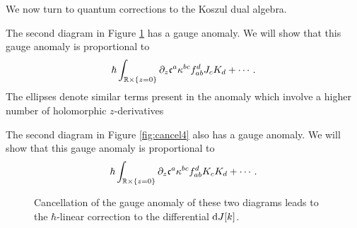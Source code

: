 \documentclass[11pt]{amsart}
\begin{document}
We now turn to quantum corrections to the Koszul dual algebra.

The second diagram in Figure \ref{fig:cancel3} has a gauge anomaly.
We will show that this gauge anomaly is proportional to 
\[
\hbar \int_{\mathbb R \times \{z=0\}} \partial_z \mathfrak c^a \kappa^{bc} f_{ab}^d J_{c} K_{d} + \cdots .
\]
The ellipses denote similar terms present in the anomaly which involve a higher number of holomorphic $z$-derivatives 

The second diagram in Figure \ref{fig:cancel4} also has a gauge anomaly.
We will show that this gauge anomaly is proportional to 
\[
\hbar \int_{\mathbb R \times \{z=0\}} \partial_z \mathfrak c^a \kappa^{bc} f_{ab}^d K_{c} K_{d} + \cdots .
\]


\begin{figure}
	\caption{Cancellation of the gauge anomaly of these two diagrams leads to the $\hbar$-linear correction to the differential ${\rm d} J[k]$.
	\label{fig:cancel3}}
\end{figure}
\end{document}
